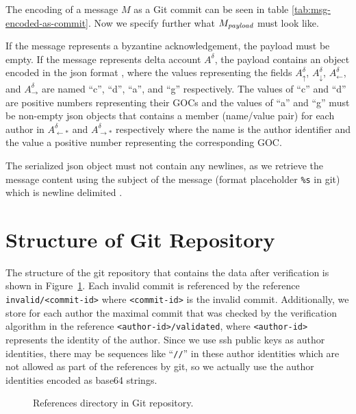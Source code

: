 The encoding of a message $M$ as a Git commit can be seen in table \ref{tab:msg-encoded-as-commit}. Now we specify further what $M_\emph{payload}$ must look like.

If the message represents a byzantine acknowledgement, the payload must be empty.
If the message represents delta account $A^\delta$, the payload contains an object encoded in the json format \cite{json}, where the values representing the fields $A^\delta_\uparrow$, $A^\delta_\downarrow$, $A^\delta_\leftarrow$, and $A^\delta_\rightarrow$ are named ``c'', ``d'', ``a'', and ``g'' respectively. The values of ``c'' and ``d'' are positive numbers representing their GOCs and the values of ``a'' and ``g'' must be non-empty json objects that contains a member (name/value pair) for each author in $A^\delta_{\leftarrow*}$ and $A^\delta_{\rightarrow*}$ respectively where the name is the author identifier and the value a positive number representing the corresponding GOC.

The serialized json object must not contain any newlines, as we retrieve the message content using the subject of the message (format placeholder \texttt{\%s} in git) which is newline delimited \cite{git-subject-line}.


\section{Structure of Git Repository}
The structure of the git repository that contains the data after verification is shown in Figure~\ref{fig:repo-structure}. Each invalid commit is referenced by the reference \texttt{invalid/<commit-id>} where \texttt{<commit-id>} is the invalid commit. Additionally, we store for each author the maximal commit that was checked by the verification algorithm in the reference \texttt{<author-id>/validated}, where \texttt{<author-id>} represents the identity of the author. Since we use ssh public keys as author identities, there may be sequences like ``\texttt{//}'' in these author identities which are not allowed as part of the references by git, so we actually use the author identities encoded as base64 strings.

\begin{figure}[h!]
    \caption{References directory in Git repository.}
    \label{fig:repo-structure}
\end{figure}

